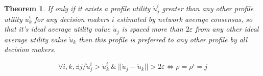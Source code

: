 \documentclass[conference]{IEEEtran}
\newtheorem{theorem}{Theorem}
\begin{document}
\begin{theorem}
\label{th-preference}
If only if it exists a profile utility $\dot{u}_j^i$ greater than any other profile utility $\dot{u}_k^i$ for any decision makers $i$ estimated by network average consensus, so that it's ideal average utility value $\dot{u}_j$ is spaced more than $2 \varepsilon$ from any other ideal average utility value $\dot{u}_k $ then this profile is preferred to any other profile by all decision makers. 
 
\begin{equation}
\label{eq-decision-discriminant}
\forall i, k, \exists j / \dot{u}_j^i > \dot{u}_k^i \ \& \ || \dot{u}_j - \dot{u}_k|| > 2 \varepsilon \Longleftrightarrow \rho = \rho^i = j
\end{equation}

\end{theorem}
\end{document}
